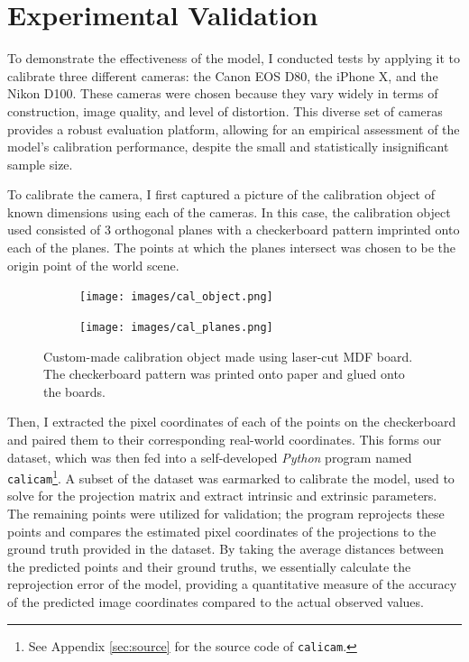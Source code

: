 \section{Experimental Validation}

To demonstrate the effectiveness of the model, I conducted tests by applying it to calibrate three different cameras: the Canon EOS D80, the iPhone X, and the Nikon D100. These cameras were chosen because they vary widely in terms of construction, image quality, and level of distortion. This diverse set of cameras provides a robust evaluation platform, allowing for an empirical assessment of the model's calibration performance, despite the small and statistically insignificant sample size.

To calibrate the camera, I first captured a picture of the calibration object of known dimensions using each of the cameras. In this case, the calibration object used consisted of 3 orthogonal planes with a checkerboard pattern imprinted onto each of the planes. The points at which the planes intersect was chosen to be the origin point of the world scene.

\begin{figure}[H]
    \centering
    \begin{subfigure}{0.5\textwidth}
        \centering
        \texttt{[image: images/cal\_object.png]}
    \end{subfigure}%
    \begin{subfigure}{0.5\textwidth}
        \centering
        \texttt{[image: images/cal\_planes.png]}
    \end{subfigure}
    \caption{Custom-made calibration object made using laser-cut MDF board. The checkerboard pattern was printed onto paper and glued onto the boards.}
\end{figure}

Then, I extracted the pixel coordinates of each of the points on the checkerboard and paired them to their corresponding real-world coordinates. This forms our dataset, which was then fed into a self-developed \emph{Python} program named \texttt{calicam}\footnote{See Appendix \ref{sec:source} for the source code of \texttt{calicam}.}. A subset of the dataset was earmarked to calibrate the model, used to solve for the projection matrix and extract intrinsic and extrinsic parameters. The remaining points were utilized for validation; the program reprojects these points and compares the estimated pixel coordinates of the projections to the ground truth provided in the dataset. By taking the average distances between the predicted points and their ground truths, we essentially calculate the reprojection error of the model, providing a quantitative measure of the accuracy of the predicted image coordinates compared to the actual observed values.

